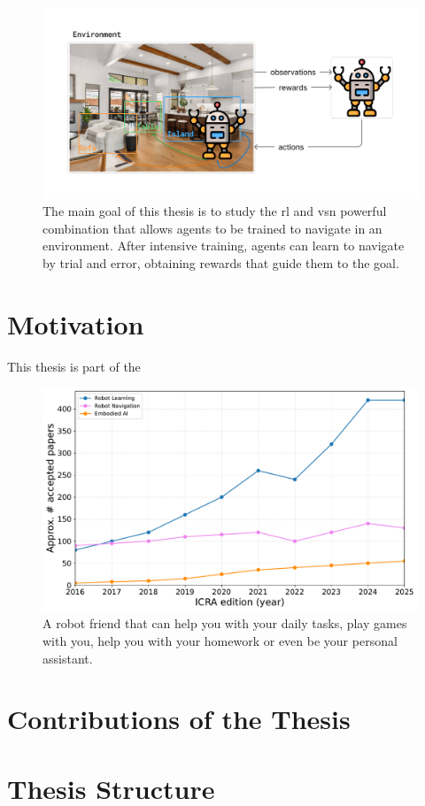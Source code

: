 \begin{figure}
    \centering
    \includegraphics[trim=30 30 30 30, clip, width=\textwidth]{figures/introduction/abstract_thesis}
    \caption{The main goal of this thesis is to study the \acrshort{rl} and \acrshort{vsn} powerful combination that allows agents to be trained to navigate in an environment. After intensive training, agents can learn to navigate by trial and error, obtaining rewards that guide them to the goal.}
    \label{fig:abstract_thesis}
\end{figure}

\section{Motivation}\label{sec:motivation}

This thesis is part of the

\begin{figure}
    \centering
    \includegraphics[width=\textwidth]{figures/introduction/icra_papers}
    \caption{A robot friend that can help you with your daily tasks, play games with you, help you with your homework or even be your personal assistant.}
    \label{fig:icra_papers}
\end{figure}


\section{Contributions of the Thesis}\label{sec:contributions-of-the-thesis}


\section{Thesis Structure}\label{sec:thesis-structure}